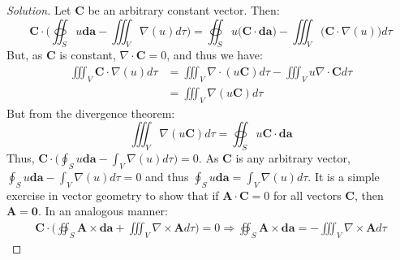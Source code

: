 \documentclass[oneside]{book}
\theoremstyle{mystyle}
\begin{document}
\begin{proof}[Solution]
Let $\mathbf{C}$ be an arbitrary constant vector. Then:
%
\begin{equation*}
    \mathbf{C}\cdot\bigg(\oiint_{S}u\boldsymbol{da} - \iiint_V \nabla(u)d\tau\bigg) = \oiint_{S} u \bigg(\mathbf{C}\cdot \boldsymbol{da}\bigg) - \iiint_{V} \bigg(\mathbf{C}\cdot \nabla(u)\bigg) d\tau    
\end{equation*}
%
But, as $\mathbf{C}$ is constant, $\nabla \cdot \mathbf{C} = 0$, and thus we have:
%
\begin{align*}
    \iiint_{V} \mathbf{C}\cdot \nabla(u) d\tau &= \iiint_{V} \nabla \cdot (u \mathbf{C}) d\tau - \iiint_{V} u \nabla \cdot \mathbf{C} d\tau\\
    &= \iiint_{V} \nabla(u\mathbf{C}) d\tau    
\end{align*}
But from the divergence theorem:
\begin{equation*}
    \iiint_{V}\nabla(u\mathbf{C}) d\tau = \oiint_{S}u\mathbf{C}\cdot \boldsymbol{da}
\end{equation*} Thus, $\mathbf{C}\cdot\big(\oint_{S}u \boldsymbol{da} - \int_{V} \nabla(u) d\tau \big) = 0$. As $\mathbf{C}$ is any arbitrary vector, $\oint_{S}u \boldsymbol{da} - \int_{V} \nabla(u) d\tau =0$ and thus $\oint_{S} u\boldsymbol{da}= \int_{V} \nabla(u)d\tau$. It is a simple exercise in vector geometry to show that if $\mathbf{A}\cdot \mathbf{C} = 0$ for all vectors $\mathbf{C}$, then $\mathbf{A} = \mathbf{0}$. In an analogous manner:
\begin{align*}
    \mathbf{C}\cdot\bigg(\oiint_{S}\mathbf{A}\times\boldsymbol{da}+\iiint_{V}\nabla\times\mathbf{A}d\tau\bigg)=0\Rightarrow\oiint_{S}\mathbf{A}\times \boldsymbol{da}=-\iiint_{V}\nabla\times\mathbf{A}d\tau
\end{align*}
\end{proof}
\end{document}

